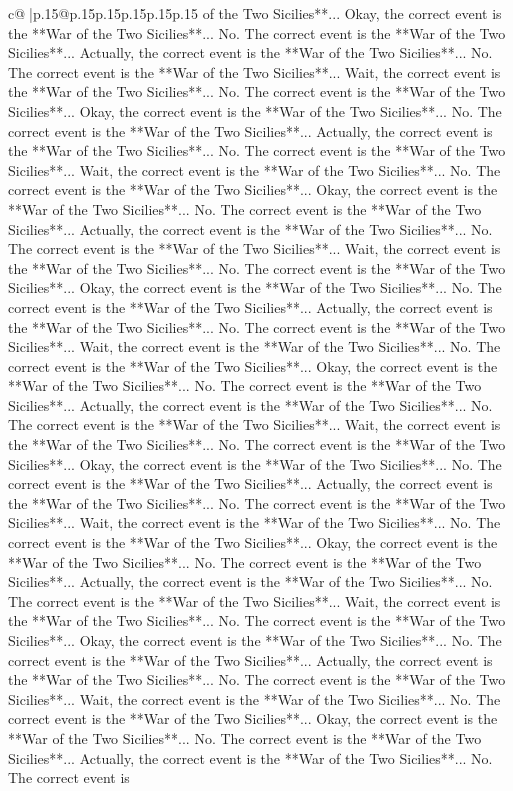 \documentclass{article}
\begin{document}
{\begin{supertabular}{c@{$\;$}|p{.15\linewidth}@{}p{.15\linewidth}p{.15\linewidth}p{.15\linewidth}p{.15\linewidth}p{.15\linewidth}}
{{{of the Two Sicilies**... Okay, the correct event is the **War of the Two Sicilies**... No. The correct event is the **War of the Two Sicilies**... Actually, the correct event is the **War of the Two Sicilies**... No. The correct event is the **War of the Two Sicilies**... Wait, the correct event is the **War of the Two Sicilies**... No. The correct event is the **War of the Two Sicilies**... Okay, the correct event is the **War of the Two Sicilies**... No. The correct event is the **War of the Two Sicilies**... Actually, the correct event is the **War of the Two Sicilies**... No. The correct event is the **War of the Two Sicilies**... Wait, the correct event is the **War of the Two Sicilies**... No. The correct event is the **War of the Two Sicilies**... Okay, the correct event is the **War of the Two Sicilies**... No. The correct event is the **War of the Two Sicilies**... Actually, the correct event is the **War of the Two Sicilies**... No. The correct event is the **War of the Two Sicilies**... Wait, the correct event is the **War of the Two Sicilies**... No. The correct event is the **War of the Two Sicilies**... Okay, the correct event is the **War of the Two Sicilies**... No. The correct event is the **War of the Two Sicilies**... Actually, the correct event is the **War of the Two Sicilies**... No. The correct event is the **War of the Two Sicilies**... Wait, the correct event is the **War of the Two Sicilies**... No. The correct event is the **War of the Two Sicilies**... Okay, the correct event is the **War of the Two Sicilies**... No. The correct event is the **War of the Two Sicilies**... Actually, the correct event is the **War of the Two Sicilies**... No. The correct event is the **War of the Two Sicilies**... Wait, the correct event is the **War of the Two Sicilies**... No. The correct event is the **War of the Two Sicilies**... Okay, the correct event is the **War of the Two Sicilies**... No. The correct event is the **War of the Two Sicilies**... Actually, the correct event is the **War of the Two Sicilies**... No. The correct event is the **War of the Two Sicilies**... Wait, the correct event is the **War of the Two Sicilies**... No. The correct event is the **War of the Two Sicilies**... Okay, the correct event is the **War of the Two Sicilies**... No. The correct event is the **War of the Two Sicilies**... Actually, the correct event is the **War of the Two Sicilies**... No. The correct event is the **War of the Two Sicilies**... Wait, the correct event is the **War of the Two Sicilies**... No. The correct event is the **War of the Two Sicilies**... Okay, the correct event is the **War of the Two Sicilies**... No. The correct event is the **War of the Two Sicilies**... Actually, the correct event is the **War of the Two Sicilies**... No. The correct event is the **War of the Two Sicilies**... Wait, the correct event is the **War of the Two Sicilies**... No. The correct event is the **War of the Two Sicilies**... Okay, the correct event is the **War of the Two Sicilies**... No. The correct event is the **War of the Two Sicilies**... Actually, the correct event is the **War of the Two Sicilies**... No. The correct event is }}}
\end{supertabular}}
\end{document}
